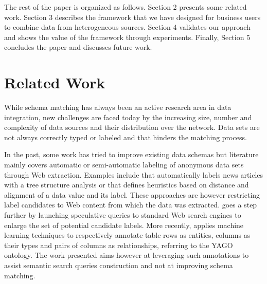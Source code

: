 \documentclass{sig-alternate}
\begin{document}
The rest of the paper is organized as follows. Section 2 presents some related work. Section 3 describes the framework that we have designed for business users to combine data from heterogeneous sources. Section 4 validates our approach and shows the value of the framework through experiments. Finally, Section 5 concludes the paper and discusses future work.


\section{Related Work}

While schema matching has always been an active research area in data integration, new challenges are faced today by the increasing size, number and complexity of data sources and their distribution over the network. Data sets are not always correctly typed or labeled and that hinders the matching process.

In the past, some work has tried to improve existing data schemas \cite{ DBLP:journals/debu/MillerA03} but literature mainly covers automatic or semi-automatic labeling of anonymous data sets through Web extraction. Examples include \cite{cas04} that automatically labels news articles with a tree structure analysis or \cite{wang2003extraction} that defines heuristics based on distance and alignment of a data value and its label. These approaches are however restricting label candidates to Web content from which the data was extracted. \cite{DBLP:conf/otm/SilvaBCS07} goes a step further by launching speculative queries to standard Web search engines to enlarge the set of potential candidate labels. More recently, \cite{Limaye:2010:ASW:1920841.1921005} applies machine learning techniques to respectively annotate table rows as entities, columns as their types and pairs of columns as relationships, referring to the YAGO ontology. The work presented aims however at leveraging such annotations to assist semantic search queries construction and not at improving schema matching.
\end{document}
